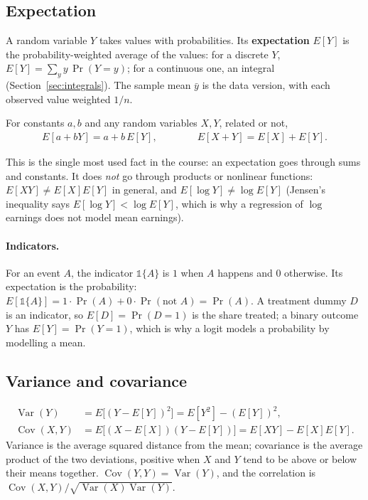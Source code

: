 \documentclass[11pt]{article}
\theoremstyle{definition}
\DeclareMathOperator{\Var}{Var}
\DeclareMathOperator{\Cov}{Cov}
\newcommand{\E}{E}
\newcommand{\ind}{\mathds{1}}
\begin{document}
\subsection{Expectation}

A random variable $Y$ takes values with probabilities. Its
\textbf{expectation} $\E[Y]$ is the probability-weighted average of the
values: for a discrete $Y$, $\E[Y] = \sum_y y\,\Pr(Y = y)$; for a
continuous one, an integral (Section~\ref{sec:integrals}). The sample mean
$\bar y$ is the data version, with each observed value weighted $1/n$.

\begin{rulebox}
For constants $a, b$ and any random variables $X, Y$, related or not,
\begin{align*}
  \E[a + bY] = a + b\,\E[Y], \qquad\qquad \E[X + Y] = \E[X] + \E[Y].
\end{align*}
\end{rulebox}
This is the single most used fact in the course: an expectation goes
through sums and constants. It does \emph{not} go through products or
nonlinear functions: $\E[XY] \ne \E[X]\E[Y]$ in general, and $\E[\log Y]
\ne \log\E[Y]$ (Jensen's inequality says $\E[\log Y] < \log\E[Y]$, which is
why a regression of $\log$ earnings does not model mean earnings).

\paragraph{Indicators.} For an event $A$, the indicator $\ind\{A\}$ is $1$
when $A$ happens and $0$ otherwise. Its expectation is the probability:
$\E[\ind\{A\}] = 1\cdot\Pr(A) + 0\cdot\Pr(\text{not }A) = \Pr(A)$. A
treatment dummy $D$ is an indicator, so $\E[D] = \Pr(D = 1)$ is the share
treated; a binary outcome $Y$ has $\E[Y] = \Pr(Y = 1)$, which is why a
logit models a probability by modelling a mean.

\subsection{Variance and covariance}

\begin{align*}
  \Var(Y) &= \E\big[(Y - \E[Y])^2\big] = \E[Y^2] - (\E[Y])^2, \\
  \Cov(X, Y) &= \E\big[(X - \E[X])(Y - \E[Y])\big] = \E[XY] - \E[X]\E[Y].
\end{align*}
Variance is the average squared distance from the mean; covariance is the
average product of the two deviations, positive when $X$ and $Y$ tend to be
above or below their means together. $\Cov(Y, Y) = \Var(Y)$, and the
correlation is $\Cov(X,Y)/\sqrt{\Var(X)\Var(Y)}$.
\end{document}
